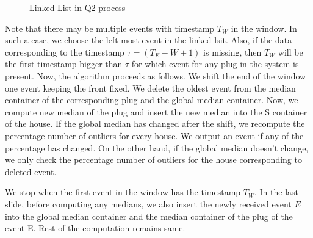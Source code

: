 \begin{figure}[h]
\begin{center}
\caption{Linked List in Q2 process}
\end{center}
\end{figure}

Note that there may be multiple events with timestamp $T_W$ in the window. In such a case, we choose the left most event in the linked lsit. Also, if the data corresponding to the timestamp $\tau = (T_E - W +1)$ is missing, then $T_W$ will be the first timestamp bigger than $\tau$ for which event for any plug in the system is present. Now, the algorithm proceeds as follows. We shift the end of the window one event keeping the front fixed. We delete the oldest event from the median container of the corresponding plug and the global median container. Now, we compute new median of the plug and insert the new median into the S container of the house. If the global median has changed after the shift, we recompute the percentage number of outliers for every house. We output an event if any of the percentage has changed. On the other hand, if the global median doesn't change, we only check the percentage number of outliers for the house corresponding to deleted event.

We stop when the first event in the window has the timestamp $T_W$. In the last slide, before computing any medians, we also insert the newly received event $E$ into the global median container and the median container of the plug of the event E. Rest of the computation remains same.

